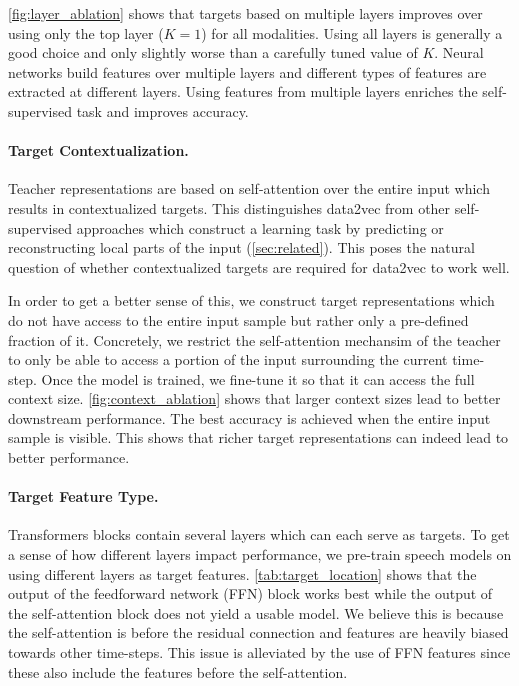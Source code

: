 \documentclass[nohyperref]{article}
\theoremstyle{plain}
\theoremstyle{definition}
\theoremstyle{remark}
\begin{document}
\autoref{fig:layer_ablation} shows that targets based on multiple layers improves over using only the top layer ($K=1$) for all modalities.
Using all layers is generally a good choice and only slightly worse than a carefully tuned value of $K$.
Neural networks build features over multiple layers and different types of features are extracted at different layers.
Using features from multiple layers enriches the self-supervised task and improves accuracy.


\paragraph{Target Contextualization.}
Teacher representations are based on self-attention over the entire input which results in contextualized targets.
This distinguishes data2vec from other self-supervised approaches which construct a learning task by predicting or reconstructing local parts of the input (\textsection\ref{sec:related}).
This poses the natural question of whether contextualized targets are required for data2vec to work well.

In order to get a better sense of this, we construct target representations which do not have access to the entire input sample but rather only a pre-defined fraction of it.
Concretely, we restrict the self-attention mechansim of the teacher to only be able to access a portion of the input surrounding the current time-step.
Once the model is trained, we fine-tune it so that it can access the full context size.
\autoref{fig:context_ablation} shows that larger context sizes lead to better downstream performance. 
The best accuracy is achieved when the entire input sample is visible.
This shows that richer target representations can indeed lead to better performance.

\insertTargetFeatureAblation


\paragraph{Target Feature Type.}
Transformers blocks contain several layers which can each serve as targets.
To get a sense of how different layers impact performance, we pre-train speech models on \libri{} using different layers as target features.
\autoref{tab:target_location} shows that the output of the feedforward network (FFN) block works best while the output of the self-attention block does not yield a usable model.
We believe this is because the self-attention is before the residual connection and features are heavily biased towards other time-steps. 
This issue is alleviated by the use of FFN features since these also include the features before the self-attention.
\end{document}
